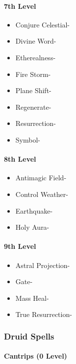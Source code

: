 \documentclass[
]{article}
\providecommand{\tightlist}{%
  \setlength{\itemsep}{0pt}\setlength{\parskip}{0pt}}
\begin{document}
\hypertarget{7th-level-1}{%
\paragraph{7th Level}\label{7th-level-1}}

\begin{itemize}
\tightlist
\item
  Conjure Celestial-
\item
  Divine Word-
\item
  Etherealness-
\item
  Fire Storm-
\item
  Plane Shift-
\item
  Regenerate-
\item
  Resurrection-
\item
  Symbol-
\end{itemize}

\hypertarget{8th-level-1}{%
\paragraph{8th Level}\label{8th-level-1}}

\begin{itemize}
\tightlist
\item
  Antimagic Field-
\item
  Control Weather-
\item
  Earthquake-
\item
  Holy Aura-
\end{itemize}

\hypertarget{9th-level-1}{%
\paragraph{9th Level}\label{9th-level-1}}

\begin{itemize}
\tightlist
\item
  Astral Projection-
\item
  Gate-
\item
  Mass Heal-
\item
  True Resurrection-
\end{itemize}

\hypertarget{druid-spells}{%
\subsubsection{Druid Spells}\label{druid-spells}}

\hypertarget{cantrips-0-level-2}{%
\paragraph{Cantrips (0 Level)}\label{cantrips-0-level-2}}
\end{document}
